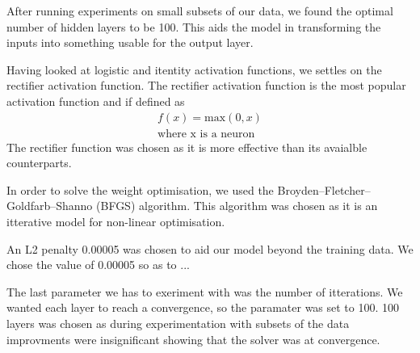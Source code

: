 \documentclass[bsc,frontabs,twoside,singlespacing,parskip,deptreport]{infthesis}     %
\begin{document}
 After running experiments on  small subsets of our data, we found the optimal number of hidden layers to be 100. 
 This aids the model in transforming the inputs into something usable for the output layer.
 
 Having looked at logistic and itentity activation functions, we settles on the rectifier activation function.
 The rectifier activation function is the most popular activation function \cite{lecun2015deep} and if defined as
 \begin{eqnarray}
   f(x) = \text{max}(0,x)\nonumber\\
   \text{where x is a neuron}\nonumber
 \end{eqnarray}
 The rectifier function was chosen as it is more effective than its avaialble counterparts\cite{glorot2011deep}.

 In order to solve the weight optimisation, we used the Broyden–Fletcher–Goldfarb–Shanno (BFGS) algorithm.
 This algorithm was chosen as it is an itterative model for non-linear optimisation.

 An L2 penalty 0.00005 was chosen to aid our model beyond the training data.
 We chose the value of 0.00005 so as to ...

 The last parameter we has to exeriment with was the number of itterations.
 We wanted each layer to reach a convergence, so the paramater was set to 100.
 100 layers was chosen as during experimentation with subsets of the data improvments were insignificant showing that the solver was at convergence.

%
\end{document}
